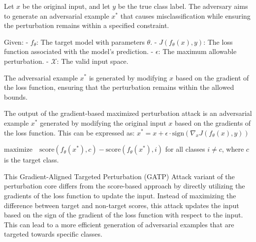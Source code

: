Let $x$ be the original input, and let $y$ be the true class label. The adversary aims to generate an adversarial example $x^*$ that causes misclassification while ensuring the perturbation remains within a specified constraint.

Given:
- $f_{\theta}$: The target model with parameters $\theta$.
- $J(f_{\theta}(x), y)$: The loss function associated with the model’s prediction.
- $\epsilon$: The maximum allowable perturbation.
- $\mathcal{X}$: The valid input space.

The adversarial example $x^*$ is generated by modifying $x$ based on the gradient of the loss function, ensuring that the perturbation remains within the allowed bounds.


The output of the gradient-based maximized perturbation attack is an adversarial example $x^*$ generated by modifying the original input $x$ based on the gradients of the loss function. This can be expressed as:
$x^* = x + \epsilon \cdot \text{sign}(\nabla_x J(f_\theta(x), y))$

$\text{maximize} \quad \text{score}(f_\theta(x^*), c) - \text{score}(f_\theta(x^*), i)$
for all classes $i \neq c$, where $c$ is the target class.

This Gradient-Aligned Targeted Perturbation (GATP) Attack  variant of the perturbation core differs from the score-based approach by directly utilizing the gradients of the loss function to update the input. Instead of maximizing the difference between target and non-target scores, this attack updates the input based on the sign of the gradient of the loss function with respect to the input. This can lead to a more efficient generation of adversarial examples that are targeted towards specific classes.